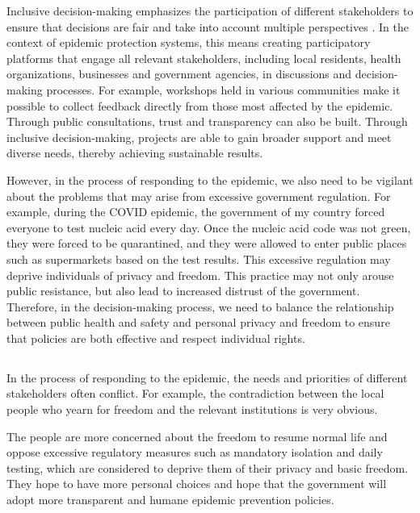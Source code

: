 \documentclass[UTF8,a4paper,AutoFakeBold,AutoFakeSlant]{article}
\begin{document}
Inclusive decision-making emphasizes the participation of different stakeholders to ensure that decisions are fair and take into account multiple perspectives \cite{heijne2013effective}.
In the context of epidemic protection systems, this means creating participatory platforms that engage all relevant stakeholders, including local residents, health organizations, businesses and government agencies, in discussions and decision-making processes. For example, workshops held in various communities make it possible to collect feedback directly from those most affected by the epidemic. Through public consultations, trust and transparency can also be built. Through inclusive decision-making, projects are able to gain broader support and meet diverse needs, thereby achieving sustainable results.

However, in the process of responding to the epidemic, we also need to be vigilant about the problems that may arise from excessive government regulation. For example, during the COVID epidemic, the government of my country forced everyone to test nucleic acid every day. Once the nucleic acid code was not green, they were forced to be quarantined, and they were allowed to enter public places such as supermarkets based on the test results. This excessive regulation may deprive individuals of privacy and freedom. This practice may not only arouse public resistance, but also lead to increased distrust of the government. Therefore, in the decision-making process, we need to balance the relationship between public health and safety and personal privacy and freedom to ensure that policies are both effective and respect individual rights.

\subsection{}

In the process of responding to the epidemic, the needs and priorities of different stakeholders often conflict. For example, the contradiction between the local people who yearn for freedom and the relevant institutions is very obvious.

The people are more concerned about the freedom to resume normal life and oppose excessive regulatory measures such as mandatory isolation and daily testing, which are considered to deprive them of their privacy and basic freedom. They hope to have more personal choices and hope that the government will adopt more transparent and humane epidemic prevention policies.
\end{document}
